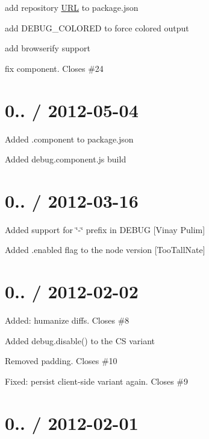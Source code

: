 \begin{DoxyItemize}
\item add repository \mbox{\hyperlink{namespace_u_r_l}{U\+RL}} to package.\+json
\item add D\+E\+B\+U\+G\+\_\+\+C\+O\+L\+O\+R\+ED to force colored output
\item add browserify support
\item fix component. Closes \#24
\end{DoxyItemize}

\section*{0.. / 2012-\/05-\/04 }


\begin{DoxyItemize}
\item Added .component to package.\+json
\item Added debug.\+component.\+js build
\end{DoxyItemize}

\section*{0.. / 2012-\/03-\/16 }


\begin{DoxyItemize}
\item Added support for \char`\"{}-\/\char`\"{} prefix in D\+E\+B\+UG \mbox{[}Vinay Pulim\mbox{]}
\item Added {\ttfamily .enabled} flag to the node version \mbox{[}Too\+Tall\+Nate\mbox{]}
\end{DoxyItemize}

\section*{0.. / 2012-\/02-\/02 }


\begin{DoxyItemize}
\item Added\+: humanize diffs. Closes \#8
\item Added {\ttfamily debug.\+disable()} to the CS variant
\item Removed padding. Closes \#10
\item Fixed\+: persist client-\/side variant again. Closes \#9
\end{DoxyItemize}

\section*{0.. / 2012-\/02-\/01 }


